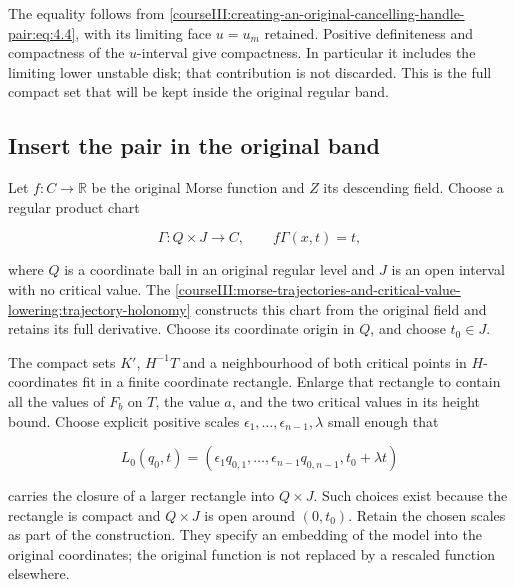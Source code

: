 The equality follows from \eqref{courseIII:creating-an-original-cancelling-handle-pair:eq:4.4}, with its limiting face \(u=u_m\) retained. Positive definiteness and compactness of the \(u\)-interval give compactness. In particular it includes the limiting lower unstable disk; that contribution is not discarded. This is the full compact set that will be kept inside the original regular band.

\subsection{Insert the pair in the original band}
\label{courseIII:creating-an-original-cancelling-handle-pair:pair-original-band}

\label{courseIII:creating-an-original-cancelling-handle-pair:section-5}\label{courseIII:pair-creation:5}

Let \(f:C\to\mathbb R\) be the original Morse function and \(Z\) its descending field. Choose a regular product chart

\begin{equation}
\Gamma:Q\times J\longrightarrow C,\qquad f\Gamma(x,t)=t,
 \label{courseIII:creating-an-original-cancelling-handle-pair:eq:5.1}
\end{equation}

where \(Q\) is a coordinate ball in an original regular level and \(J\) is an open interval with no critical value. The \cref{courseIII:morse-trajectories-and-critical-value-lowering:trajectory-holonomy} constructs this chart from the original field and retains its full derivative. Choose its coordinate origin in \(Q\), and choose \(t_0\in J\).

The compact sets \(K'\), \(H^{-1}T\) and a neighbourhood of both critical points in \(H\)-coordinates fit in a finite coordinate rectangle. Enlarge that rectangle to contain all the values of \(F_b\) on \(T\), the value \(a\), and the two critical values in its height bound. Choose explicit positive scales \(\epsilon_1,\ldots,\epsilon_{n-1},\lambda\) small enough that

\begin{equation}
L_0(q_0,t)=(\epsilon_1q_{0,1},\ldots,\epsilon_{n-1}q_{0,n-1},
                         t_0+\lambda t)
 \label{courseIII:creating-an-original-cancelling-handle-pair:eq:5.2}
\end{equation}

carries the closure of a larger rectangle into \(Q\times J\). Such choices exist because the rectangle is compact and \(Q\times J\) is open around \((0,t_0)\). Retain the chosen scales as part of the construction. They specify an embedding of the model into the original coordinates; the original function is not replaced by a rescaled function elsewhere.

